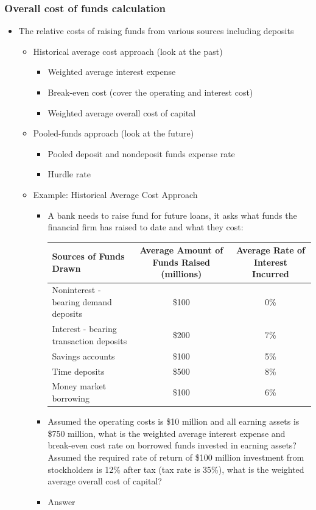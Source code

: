 \subsubsection{Overall cost of funds calculation}
\begin{itemize}
\item The relative costs of raising funds from various sources including deposits
    \begin{itemize}
    \item Historical average cost approach (look at the past)    
        \begin{itemize}
        \item Weighted average interest expense
        \item Break-even cost (cover the operating and interest cost)
        \item Weighted average overall cost of capital
        \end{itemize}
    \item Pooled-funds approach (look at the future)
        \begin{itemize}
        \item Pooled deposit and nondeposit funds expense rate
        \item Hurdle rate
        \end{itemize}
    \item Example: Historical Average Cost Approach
        \begin{itemize}
        \item A bank needs to raise fund for future loans, it asks what funds the financial firm has raised to date and what they cost:
            \begin{table}[h]
            \centering
            \begin{tabular}{|l|c|c|}
            \hline
            Sources of Funds Drawn & Average Amount of Funds Raised (millions) & Average Rate of Interest Incurred \\ \hline
            Noninterest - bearing demand deposits & \$100 & 0\% \\ \hline
            Interest - bearing transaction deposits & \$200 & 7\% \\ \hline
            Savings accounts & \$100 & 5\% \\ \hline
            Time deposits & \$500 & 8\% \\ \hline
            Money market borrowing & \$100 & 6\% \\ \hline
            \end{tabular}
            \end{table}
        \item Assumed the operating costs is \$10 million and all earning assets is \$750 million, what is the weighted average interest expense and break-even cost rate on borrowed funds invested in earning assets? Assumed the required rate of return of \$100 million investment from stockholders is 12\% after tax (tax rate is 35\%), what is the weighted average overall cost of capital?
        \item Answer
        

\end{itemize}
\end{itemize}
\end{itemize}
